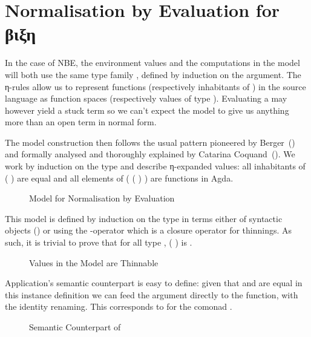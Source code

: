 \section{Normalisation by Evaluation for βιξη}
\label{normbye}

In the case of NBE, the environment values and the computations in the model
will both use the same type family , defined by induction on the
 argument. The η-rules allow us to represent functions (respectively
inhabitants of ) in the source language as function spaces
(respectively values of type ). Evaluating a  may however
yield a stuck term so we can't expect the model to give us anything more than
an open term in normal form.

The model construction then follows the usual pattern pioneered by
Berger~(\citeyear{berger1993program}) and formally analysed and thoroughly
explained by Catarina Coquand~(\citeyear{coquand2002formalised}). We work
by induction on the type and describe η-expanded values: all inhabitants
of (  ) are equal and all elements
of ( (  ) ) are functions in Agda.

\begin{figure}[h]
\caption{Model for Normalisation by Evaluation\label{fig:nbemodel}}
\end{figure}

This model is defined by induction on the type in terms either of
syntactic objects () or using the -operator which is
a closure operator for thinnings. As such, it is trivial to prove
that for all type , ( ) is .

\begin{figure}[h]
\caption{Values in the Model are Thinnable\label{fig:thnbemodel}}
\end{figure}

Application's semantic counterpart is easy to define: given that 
and  are equal in this instance definition we can feed the argument
directly to the function, with the identity renaming. This corresponds to
 for the comonad .

\begin{figure}[h]
\caption{Semantic Counterpart of \label{fig:nbeapp}}
\end{figure}

